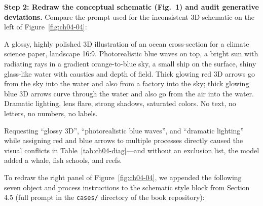 \textbf{Step 2: Redraw the conceptual schematic (Fig.\ 1) and audit generative deviations.} Compare the prompt used for the inconsistent 3D schematic on the left of Figure~\ref{fig:ch04-04}:

\begin{Prompt}
A glossy, highly polished 3D illustration of an ocean cross-section for a
climate science paper, landscape 16:9. Photorealistic blue waves on top, a
bright sun with radiating rays in a gradient orange-to-blue sky, a small ship
on the surface, shiny glass-like water with caustics and depth of field.
Thick glowing red 3D arrows go from the sky into the water and also from a
factory into the sky; thick glowing blue 3D arrows curve through the water and
also go from the air into the water. Dramatic lighting, lens flare, strong
shadows, saturated colors. No text, no letters, no numbers, no labels.
\end{Prompt}

Requesting ``glossy 3D'', ``photorealistic blue waves'', and ``dramatic lighting'' while assigning red and blue arrows to multiple processes directly caused the visual conflicts in Table~\ref{tab:ch04-diag}---and without an exclusion list, the model added a whale, fish schools, and reefs.

To redraw the right panel of Figure~\ref{fig:ch04-04}, we appended the following seven object and process instructions to the schematic style block from Section 4.5 (full prompt in the \texttt{cases/} directory of the book repository):


